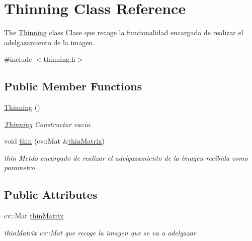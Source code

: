 \hypertarget{class_thinning}{\section{Thinning Class Reference}
\label{class_thinning}
}


The \hyperlink{class_thinning}{Thinning} class Clase que recoge la funcionalidad encargada de realizar el adelgazamiento de la imagen.  




{\ttfamily \#include $<$thinning.\+h$>$}

\subsection*{Public Member Functions}
\begin{DoxyCompactItemize}
\item 
\hypertarget{class_thinning_a7cee6b1ccf6cffba62aaae15ddb02422}{\hyperlink{class_thinning_a7cee6b1ccf6cffba62aaae15ddb02422}{Thinning} ()}\label{class_thinning_a7cee6b1ccf6cffba62aaae15ddb02422}

\begin{DoxyCompactList}\small\item\em \hyperlink{class_thinning}{Thinning} Constructor vacio. \end{DoxyCompactList}\item 
void \hyperlink{class_thinning_a46881b76d9a0c72891c422d58bc6f7ad}{thin} (cv\+::\+Mat \&\hyperlink{class_thinning_a6028e8b751e65ab7a67cd29bc6c06401}{thin\+Matrix})
\begin{DoxyCompactList}\small\item\em thin Metdo encargado de realizar el adelgazamiento de la imagen recibida como parametro \end{DoxyCompactList}\end{DoxyCompactItemize}
\subsection*{Public Attributes}
\begin{DoxyCompactItemize}
\item 
\hypertarget{class_thinning_a6028e8b751e65ab7a67cd29bc6c06401}{cv\+::\+Mat \hyperlink{class_thinning_a6028e8b751e65ab7a67cd29bc6c06401}{thin\+Matrix}}\label{class_thinning_a6028e8b751e65ab7a67cd29bc6c06401}

\begin{DoxyCompactList}\small\item\em thin\+Matrix cv\+::\+Mat que recoge la imagen que se va a adelgazar \end{DoxyCompactList}\end{DoxyCompactItemize}


